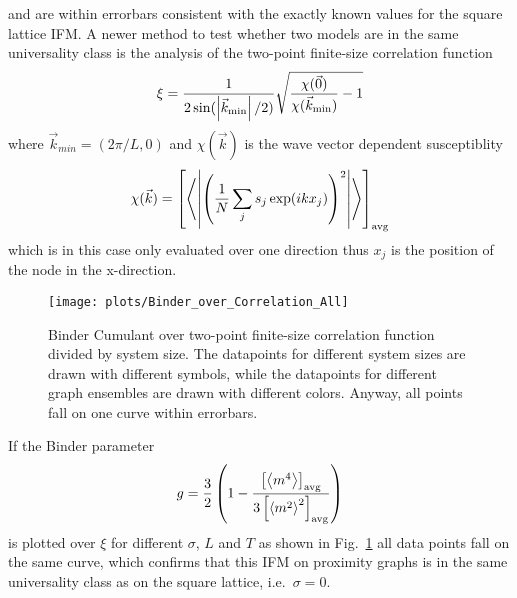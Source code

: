 and are within errorbars consistent with the exactly known values for the
square lattice IFM.
A newer method \cite{chiCollapse,Hartmann2013} to test whether two models are in
the same universality class is the analysis of the two-point finite-size
correlation function
\[\xi = \frac{1}{2\sin(\left\vert\vec{k}_{\mathrm{min}}\right\vert/2)} \sqrt{\frac{\chi(\vec{0})}{\chi(\vec{k}_{\mathrm{min}})} - 1}\]
where $\vec{k}_{min}=(2\pi / L, 0)$ and $\chi(\vec{k})$ is the wave vector
dependent susceptiblity
\[\chi(\vec{k}) = \left[ \left< \left\vert\left(\frac{1}{N}\sum_j s_j \exp(ikx_j)\right)^2\right\vert \right> \right] _{\mathrm{avg}}\]
which is in this case only evaluated over one direction thus $x_j$ is the
position of the node in the x-direction.

\begin{figure}[htbp]
    \centering
    \texttt{[image: plots/Binder\_over\_Correlation\_All]}
    \caption[Binder Cumulant over two-point finite-size correlation function divided by system size]
    {
        Binder Cumulant over two-point finite-size correlation function
        divided by system size. The datapoints for different system sizes
        are drawn with different symbols, while the datapoints for different
        graph ensembles are drawn with different colors. Anyway, all points
        fall on one curve within errorbars.
    }
    \label{fig:binderOverCorr}
\end{figure}
If the Binder parameter
\[g = \frac{3}{2}\left(1-\frac{\left[ \left< m^4 \right> \right] _{\mathrm{avg}}}{3\left[ \left< m^2 \right>^2 \right] _{\mathrm{avg}}}\right)\]
is plotted over $\xi$ for different $\sigma$, $L$ and $T$ as shown in
Fig.~\ref{fig:binderOverCorr} all data points fall on the
same curve, which confirms that this IFM on proximity graphs is in the
same universality class as on the square lattice, i.e.~$\sigma=0$.

